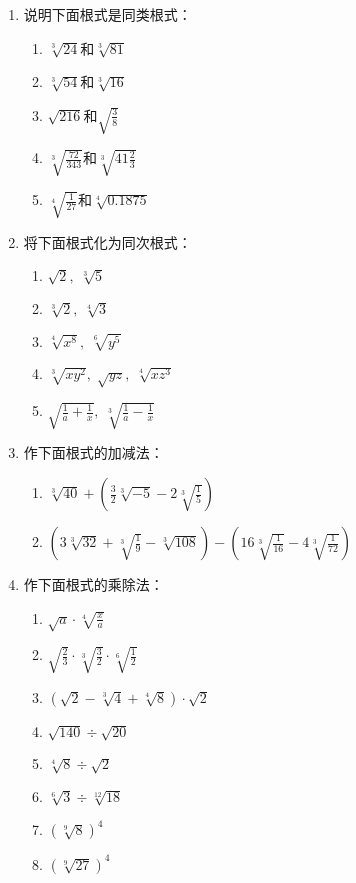 \begin{ex}
\begin{enumerate}
    \item 说明下面根式是同类根式：
\begin{multicols}{2}
\begin{enumerate}
    \item $\sqrt[3]{24}$和$\sqrt[3]{81}$
    \item $\sqrt[3]{54}$和$\sqrt[3]{16}$
    \item $\sqrt{216}$和$\sqrt{\frac{3}{8}}$
    \item $\sqrt[3]{\frac{72}{343}}$和$\sqrt[3]{41\frac{2}{3}}$
    \item $\sqrt[4]{\frac{1}{27}}$和$\sqrt[4]{0.1875}$
\end{enumerate}
\end{multicols}
    \item  将下面根式化为同次根式：
    \begin{multicols}{2}
\begin{enumerate}
    \item $\sqrt{2},\; \sqrt[3]{5}$
    \item $\sqrt[3]{2},\; \sqrt[4]{3}$
    \item $\sqrt[4]{x^8},\; \sqrt[6]{y^5}$
    \item $\sqrt[3]{xy^2},\; \sqrt{yz},\; \sqrt[4]{xz^3}$
    \item $\sqrt{\frac{1}{a}+\frac{1}{x}},\; \sqrt[3]{\frac{1}{a}-\frac{1}{x}}$
\end{enumerate}
\end{multicols}
    \item 作下面根式的加减法：
\begin{enumerate}
    \item $\sqrt[3]{40}+\left(\frac{3}{2}\sqrt[3]{-5}-2\sqrt[3]{\frac{1}{5}}\right)$
    \item $\left(3\sqrt[3]{32}+\sqrt[3]{\frac{1}{9}}-\sqrt[3]{108}\right)-\left(16\sqrt[3]{\frac{1}{16}}-4\sqrt[3]{\frac{1}{72}}\right)$
\end{enumerate}
    \item 作下面根式的乘除法：
\begin{multicols}{2}
\begin{enumerate}
    \item $\sqrt{a}\cdot \sqrt[4]{\frac{x}{a}}$
    \item $\sqrt{\frac{2}{3}}\cdot \sqrt[3]{\frac{3}{2}}\cdot \sqrt[6]{\frac{1}{2}}$
    \item $\left(\sqrt{2}-\sqrt[3]{4}+\sqrt[4]{8}\right)\cdot \sqrt{2}$
    \item $\sqrt{140}\div \sqrt{20}$
    \item $\sqrt[4]{8}\div \sqrt{2}$
    \item $\sqrt[6]{3}\div \sqrt[12]{18}$
    \item $\left(\sqrt[9]{8}\right)^4$
    \item $\left(\sqrt[9]{27}\right)^4$
\end{enumerate}
\end{multicols}
\end{enumerate}
\end{ex}

